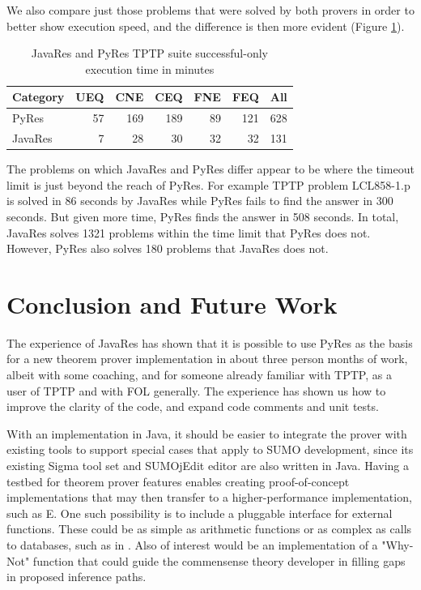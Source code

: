 \documentclass{llncs}
\begin{document}
We also compare just those problems that were solved by both provers in order to better show execution speed,
and the difference is then more evident (Figure \ref{tab:res3}).

\begin{table}[tbh]
  \begin{tabular}{lrrrrrr}
    \hline
    \textbf{Category} & \textbf{UEQ} & \textbf{CNE} & \textbf{CEQ} & \textbf{FNE} & \textbf{FEQ} & \textbf{All}\\
    \hline
    PyRes     &   57 &  169 &   189 &   89 &   121 &  628 \\
    JavaRes   &   7 &   28 &   30 &   32 &   32 &  131 \\
    \hline
  \end{tabular}
  \caption{JavaRes and PyRes TPTP suite successful-only execution time in minutes}
  \label{tab:res3}
\end{table}


The problems on which JavaRes and PyRes differ appear to be where the timeout limit is just beyond
the reach of PyRes.  For example TPTP problem LCL858-1.p is solved in 86 seconds by JavaRes while
PyRes fails to find the answer in 300 seconds.  But given more time, PyRes finds the answer in 508 seconds.
In total, JavaRes solves 1321 problems within the time limit that PyRes does not.  However, PyRes also
solves 180 problems that JavaRes does not.


\section{Conclusion and Future Work}

The experience of JavaRes has shown that it is possible to use PyRes
as the basis for a new theorem prover implementation in about three
person months of work, albeit with some coaching, and for someone
already familiar with TPTP, as a user of TPTP and with FOL generally.
The experience has shown us how to improve the clarity of the code,
and expand code comments and unit tests.

With an implementation in Java, it should be easier to integrate the
prover with existing tools to support special cases that apply to SUMO
development, since its existing Sigma tool set \cite{pease2013sigma}
and SUMOjEdit editor \cite{pease2020programmer} are also written in
Java.  Having a testbed for theorem prover features enables creating
proof-of-concept implementations that may then transfer to a
higher-performance implementation, such as E.  One such possibility is
to include a pluggable interface for external functions.  These could
be as simple as arithmetic functions or as complex as calls to
databases, such as in \cite{DBLP:conf/ki/SudaSWLM09}.  Also of
interest would be an implementation of a "Why-Not" function
\cite{10.5555/1650083.1650093} that could guide the commensense theory
developer in filling gaps in proposed inference paths.
\end{document}
